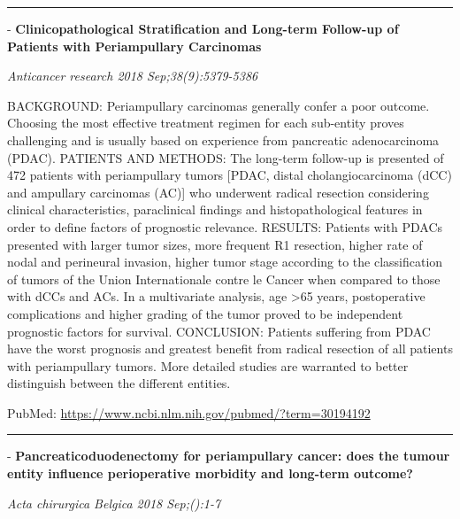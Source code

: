 \documentclass[]{article}
\begin{document}
{}

{}

\begin{center}\rule{0.5\linewidth}{\linethickness}\end{center}

 - \textbf{Clinicopathological Stratification and Long-term Follow-up of
Patients with Periampullary Carcinomas}

\emph{Anticancer research 2018 Sep;38(9):5379-5386}

BACKGROUND: Periampullary carcinomas generally confer a poor outcome.
Choosing the most effective treatment regimen for each sub-entity proves
challenging and is usually based on experience from pancreatic
adenocarcinoma (PDAC). PATIENTS AND METHODS: The long-term follow-up is
presented of 472 patients with periampullary tumors {[}PDAC, distal
cholangiocarcinoma (dCC) and ampullary carcinomas (AC){]} who underwent
radical resection considering clinical characteristics, paraclinical
findings and histopathological features in order to define factors of
prognostic relevance. RESULTS: Patients with PDACs presented with larger
tumor sizes, more frequent R1 resection, higher rate of nodal and
perineural invasion, higher tumor stage according to the classification
of tumors of the Union Internationale contre le Cancer when compared to
those with dCCs and ACs. In a multivariate analysis, age
\textgreater{}65 years, postoperative complications and higher grading
of the tumor proved to be independent prognostic factors for survival.
CONCLUSION: Patients suffering from PDAC have the worst prognosis and
greatest benefit from radical resection of all patients with
periampullary tumors. More detailed studies are warranted to better
distinguish between the different entities.

PubMed: \url{https://www.ncbi.nlm.nih.gov/pubmed/?term=30194192}

{}

{}

\begin{center}\rule{0.5\linewidth}{\linethickness}\end{center}

 - \textbf{Pancreaticoduodenectomy for periampullary cancer: does the
tumour entity influence perioperative morbidity and long-term outcome?}

\emph{Acta chirurgica Belgica 2018 Sep;():1-7}
\end{document}
